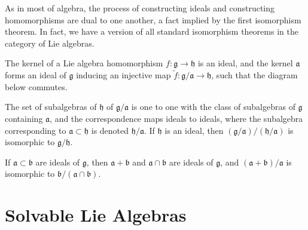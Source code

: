 As in most of algebra, the process of constructing ideals and constructing homomorphisms are dual to one another, a fact implied by the first isomorphism theorem. In fact, we have a version of all standard isomorphism theorems in the category of Lie algebras.

\begin{theorem}
    The kernel of a Lie algebra homomorphism $f: \mathfrak{g} \to \mathfrak{h}$ is an ideal, and the kernel $\mathfrak{a}$ forms an ideal of $\mathfrak{g}$ inducing an injective map $\tilde{f}: \mathfrak{g}/\mathfrak{a} \to \mathfrak{h}$, such that the diagram below commutes.
    \begin{center}
    \end{center}
\end{theorem}

\begin{theorem}
    The set of subalgebras of $\mathfrak{h}$ of $\mathfrak{g}/\mathfrak{a}$ is one to one with the class of subalgebras of $\mathfrak{g}$ containing $\mathfrak{a}$, and the correspondence maps ideals to ideals, where the subalgebra corresponding to $\mathfrak{a} \subset \mathfrak{h}$ is denoted $\mathfrak{h}/\mathfrak{a}$. If $\mathfrak{h}$ is an ideal, then $(\mathfrak{g}/\mathfrak{a})/(\mathfrak{h}/\mathfrak{a})$ is isomorphic to $\mathfrak{g}/\mathfrak{h}$.
\end{theorem}

\begin{theorem}
    If $\mathfrak{a} \subset \mathfrak{b}$ are ideals of $\mathfrak{g}$, then $\mathfrak{a} + \mathfrak{b}$ and $\mathfrak{a} \cap \mathfrak{b}$ are ideals of $\mathfrak{g}$, and $(\mathfrak{a} + \mathfrak{b})/\mathfrak{a}$ is isomorphic to $\mathfrak{b}/(\mathfrak{a} \cap \mathfrak{b})$.
\end{theorem}





\section{Solvable Lie Algebras}

